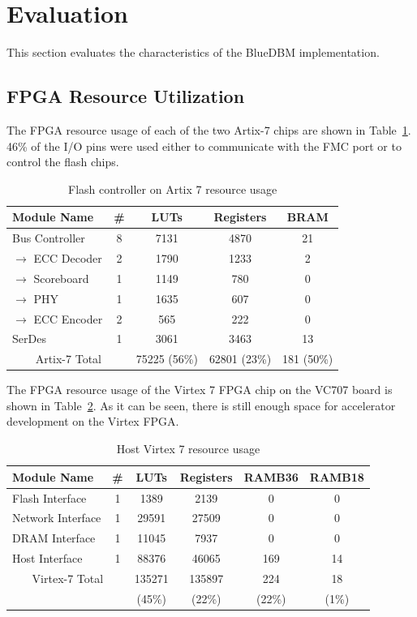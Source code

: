 \section{Evaluation}
\label{sec:results}

This section evaluates the characteristics of the BlueDBM implementation.

\subsection{FPGA Resource Utilization}

The FPGA resource usage of each of the two Artix-7 chips are shown in
Table~\ref{tab:artixutil}. 46\% of the I/O pins were used either to communicate
with the FMC port or to control the flash chips.

\begin{table}[h]\footnotesize
\centering
\begin{tabular}{l | c | c | c | c |}
Module Name & \# & LUTs & Registers & BRAM \\
\hline \hline
Bus Controller & 8 & 7131 & 4870 & 21 \\
$\rightarrow$ ECC Decoder & 2 & 1790 & 1233 & 2 \\
$\rightarrow$ Scoreboard & 1 & 1149 & 780 & 0 \\
$\rightarrow$ PHY & 1 & 1635 & 607 & 0 \\
$\rightarrow$ ECC Encoder & 2 & 565 & 222 & 0 \\
\hline
SerDes & 1 & 3061 & 3463 & 13 \\
\hline \hline
\multicolumn{2}{c}{
Artix-7 Total
} & 75225 (56\%) & 62801 (23\%) & 181 (50\%)
\end{tabular}
\caption{Flash controller on Artix 7 resource usage}
\label{tab:artixutil}
\end{table}

The FPGA resource usage of the Virtex 7 FPGA chip on the VC707 board is shown in
Table~\ref{tab:virtexutil}. As it can be seen, there is still enough space for accelerator development on the Virtex FPGA.



\begin{table}[h]\footnotesize
\centering
\begin{tabular}{l | c | c | c | c | c |}
Module Name & \# & LUTs & Registers & RAMB36 & RAMB18 \\
\hline \hline
Flash Interface & 1 & 1389 & 2139 & 0 & 0 \\
Network Interface& 1 & 29591 & 27509 & 0 & 0\\
DRAM Interface& 1 & 11045 & 7937 & 0  & 0\\
Host Interface& 1 & 88376 & 46065 & 169 & 14 \\
\hline \hline
\multicolumn{2}{c}{
Virtex-7 Total
} & 135271& 135897 & 224 & 18 \\
\multicolumn{2}{c}{
} & (45\%) & (22\%) & (22\%) & (1\%)
\end{tabular}
\caption{Host Virtex 7 resource usage}
\label{tab:virtexutil}
\end{table}


